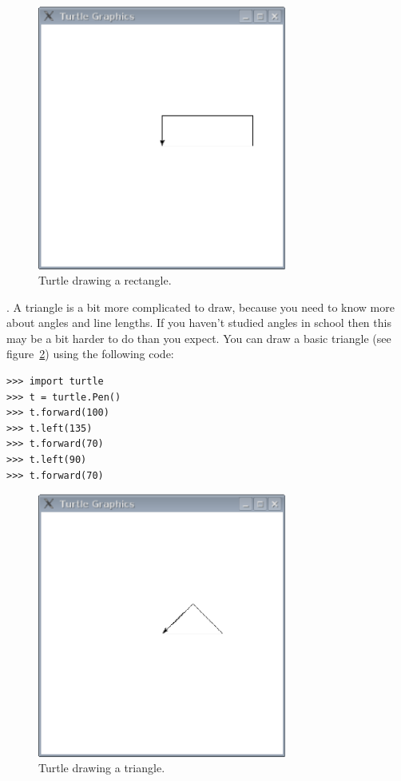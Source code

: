 \begin{figure}
\begin{center}
\includegraphics[width=82mm]{eps/figure46.eps}
\end{center}
\caption{Turtle drawing a rectangle.}\label{fig46}
\end{figure}

. A triangle is a bit more complicated to draw, because you need to know more about angles and line lengths.  If you haven't studied angles in school then this may be a bit harder to do than you expect.  You can draw a basic triangle (see figure~\ref{fig47}) using the following code:

\begin{listing}
\begin{verbatim}
>>> import turtle
>>> t = turtle.Pen()
>>> t.forward(100)
>>> t.left(135)
>>> t.forward(70)
>>> t.left(90)
>>> t.forward(70)
\end{verbatim}
\end{listing}

\begin{figure}
\begin{center}
\includegraphics[width=82mm]{eps/figure47.eps}
\end{center}
\caption{Turtle drawing a triangle.}\label{fig47}
\end{figure}


